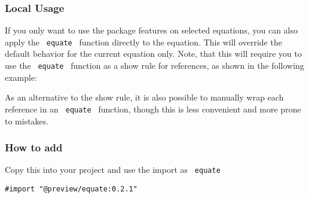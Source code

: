 \subsubsection{Local Usage}\label{local-usage}

If you only want to use the package features on selected equations, you
can also apply the \texttt{\ equate\ } function directly to the
equation. This will override the default behavior for the current
equation only. Note, that this will require you to use the
\texttt{\ equate\ } function as a show rule for references, as shown in
the following example:

\begin{Shaded}
\begin{Highlighting}[]



\NormalTok{$)}

\end{Highlighting}
\end{Shaded}

\pandocbounded{}

As an alternative to the show rule, it is also possible to manually wrap
each reference in an \texttt{\ equate\ } function, though this is less
convenient and more prone to mistakes.

\subsubsection{How to add}\label{how-to-add}

Copy this into your project and use the import as \texttt{\ equate\ }

\begin{verbatim}
#import "@preview/equate:0.2.1"
\end{verbatim}



